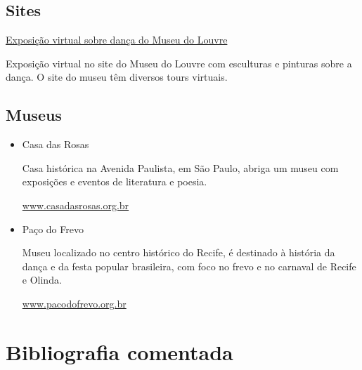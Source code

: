 \documentclass[12pt]{extarticle}
\begin{document}
\subsection{Sites}

\begin{itemize}

\href{https://petitegalerie.louvre.fr/visite-virtuelle/saison2/}{Exposição virtual sobre dança do Museu do Louvre}

Exposição virtual no site do Museu do Louvre com esculturas e pinturas sobre a dança. O site do museu têm diversos tours virtuais.

\end{itemize}

\subsection{Museus}

\begin{itemize}

\item Casa das Rosas

Casa histórica na Avenida Paulista, em São Paulo, abriga um museu com exposições e eventos de literatura e poesia.

\url{www.casadasrosas.org.br}

\item Paço do Frevo

Museu localizado no centro histórico do Recife, é destinado à história da dança e da festa popular brasileira, com foco no frevo e no carnaval de Recife e Olinda.

\url{www.pacodofrevo.org.br}

\end{itemize}

\section{Bibliografia comentada}
\end{document}
